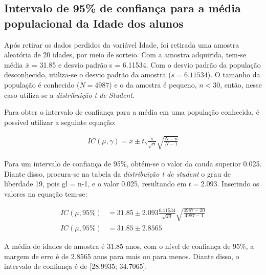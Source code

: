 \subsection{Intervalo de 95\% de confiança para a média populacional da Idade dos alunos}
\label{sub:1a}
	
	Após retirar os dados perdidos da variável Idade, foi retirada uma
	amostra aleatória de 20 idades, por meio de sorteio. Com a amostra
	adquirida, tem-se média $\bar{x}$ = \num{31,85} e desvio padrão s = \num{6,11534}.
	Com o desvio padrão da população desconhecido, utiliza-se o desvio
	padrão da amostra ($s = \num{6,11534}$).  O tamanho da população é conhecido ($N
	= 4987$) e o da amostra é pequeno, $n < 30$, então, nesse caso utiliza-se
	a \textit{distribuição t de Student}.

	Para obter o intervalo de confiança para a média em uma população
	conhecida, é possível utilizar a seguinte equação:

	
	\begin{align}
		\label{eq:dois-a-expr}
		IC (\mu, \gamma) = \bar{x} \pm t_\gamma \frac{s}{\sqrt{n}} \sqrt{\frac{N-n}{N-1}}
	\end{align}

	Para um intervalo de confiança de 95\%, obtém-se o valor da cauda
	superior \num{0,025}. Diante disso, procura-se na tabela da \textit{distribuição
	t de student} o grau de liberdade 19, pois gl = n-1, e o valor \num{0,025},
	resultando em $t = \num{2,093}$. Inserindo os valores na equação
	tem-se:

	\begin{align*}
		IC (\mu, 95\%) &= \num{31,85} \pm \num{2,093} \frac{\num{6,11534}}{\sqrt{20}} \sqrt{\frac{4987 - 20}{4987 - 1}} \\
		IC (\mu, 95\%) &= \num{31,85} \pm \num{2,8565}
	\end{align*}

	A média de idades de amostra é \num{31,85} anos, com o nível de confiança de
	95\%, a margem de erro é de \num{2,8565} anos para mais ou para menos. Diante
	disso, o intervalo de confiança é de [\num{28,9935}; \num{34,7065}].

